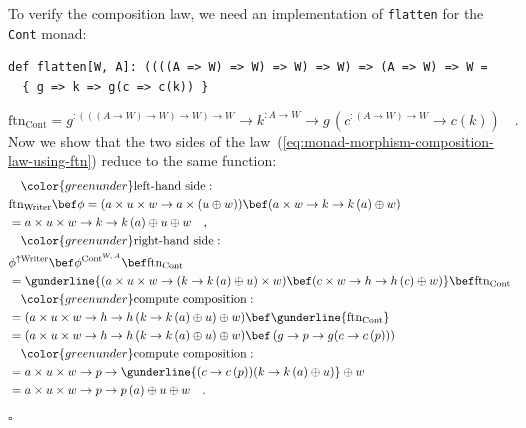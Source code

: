 To verify the composition law, we need an implementation of \lstinline!flatten!
for the \lstinline!Cont! monad:
\begin{lstlisting}
def flatten[W, A]: ((((A => W) => W) => W) => W) => (A => W) => W =
  { g => k => g(c => c(k)) }
\end{lstlisting}
\[
\text{ftn}_{\text{Cont}}=g^{:\left(\left(\left(A\rightarrow W\right)\rightarrow W\right)\rightarrow W\right)\rightarrow W}\rightarrow k^{:A\rightarrow W}\rightarrow g\,(c^{:\left(A\rightarrow W\right)\rightarrow W}\rightarrow c\left(k\right))\quad.
\]
Now we show that the two sides of the law~(\ref{eq:monad-morphism-composition-law-using-ftn})
reduce to the same function:
\begin{align*}
 & \quad{\color{greenunder}\text{left-hand side}:}\quad\\
 & \text{ftn}_{\text{Writer}}\bef\phi=(a\times u\times w\rightarrow a\times(u\oplus w))\bef(a\times w\rightarrow k\rightarrow k\left(a\right)\oplus w)\\
 & =a\times u\times w\rightarrow k\rightarrow k\left(a\right)\oplus u\oplus w\quad,\\
 & \quad{\color{greenunder}\text{right-hand side}:}\quad\\
 & \phi^{\uparrow\text{Writer}}\bef\phi^{\text{Cont}^{W,\,A}}\bef\text{ftn}_{\text{Cont}}\\
 & =\gunderline{(a\times u\times w\rightarrow(k\rightarrow k\left(a\right)\oplus u)\times w)\bef(c\times w\rightarrow h\rightarrow h\left(c\right)\oplus w)}\bef\text{ftn}_{\text{Cont}}\\
 & \quad{\color{greenunder}\text{compute composition}:}\quad\\
 & =(a\times u\times w\rightarrow h\rightarrow h\left(k\rightarrow k\left(a\right)\oplus u\right)\oplus w)\bef\gunderline{\text{ftn}_{\text{Cont}}}\\
 & =(a\times u\times w\rightarrow h\rightarrow h\left(k\rightarrow k\left(a\right)\oplus u\right)\oplus w)\bef\left(g\rightarrow p\rightarrow g(c\rightarrow c\left(p\right))\right)\\
 & \quad{\color{greenunder}\text{compute composition}:}\quad\\
 & =a\times u\times w\rightarrow p\rightarrow\gunderline{(c\rightarrow c\left(p\right))(k\rightarrow k\left(a\right)\oplus u)}\oplus w\\
 & =a\times u\times w\rightarrow p\rightarrow p\left(a\right)\oplus u\oplus w\quad.
\end{align*}
$\square$

